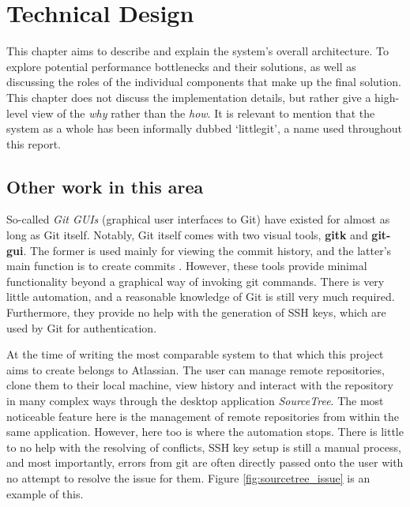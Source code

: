  \chapter{Technical Design}

This chapter aims to describe and explain the system's overall architecture. To explore potential performance bottlenecks and their solutions, as well as discussing the roles of the individual components that make up the final solution. This chapter does not discuss the implementation details, but rather give a high-level view of the \emph{why} rather than the \emph{how}. It is relevant to mention that the system as a whole has been informally dubbed `littlegit', a name used throughout this report.

\section{Other work in this area}

So-called \emph{Git GUIs} (graphical user interfaces to Git) have existed for almost as long as Git itself. Notably, Git itself comes with two visual tools, \textbf{gitk} and \textbf{git-gui}. The former is used mainly for viewing the commit history, and the latter's main function is to create commits \cite{gitguis}. However, these tools provide minimal functionality beyond a graphical way of invoking git commands. There is very little automation, and a reasonable knowledge of Git is still very much required. Furthermore, they provide no help with the generation of SSH keys, which are used by Git for authentication.

At the time of writing the most comparable system to that which this project aims to create belongs to Atlassian. The user can manage remote repositories, clone them to their local machine, view history and interact with the repository in many complex ways through the desktop application \emph{SourceTree}. The most noticeable feature here is the management of remote repositories from within the same application. However, here too is where the automation stops. There is little to no help with the resolving of conflicts, SSH key setup is still a manual process, and most importantly, errors from git are often directly passed onto the user with no attempt to resolve the issue for them. Figure \ref{fig:sourcetree_issue} is an example of this.


